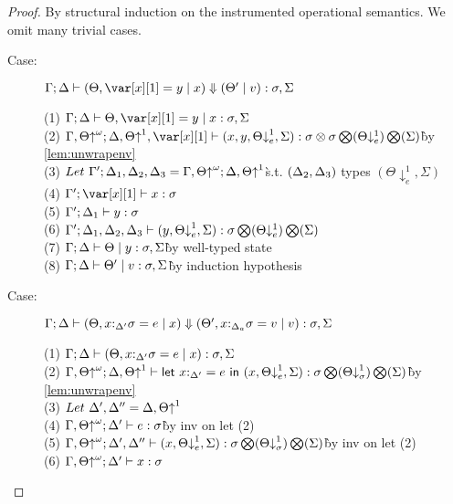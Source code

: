 \documentclass[acmsmall,review,anonymous,screen]{acmart}
\newcommand{\llet}[2]{\mathsf{let}~#1~\mathsf{in}~#2}
\begin{document}
\begin{proof}
By structural induction on the instrumented operational semantics. We
omit many trivial cases.
\begin{description}
    \item[Case:] $\Gamma; \Delta \vdash (\Theta, \xl = y \mid x) \Downarrow (\Theta' \mid v) : \s, \Sigma$
\begin{tabbing}
    (1) $\G; \D \vdash \Theta, \xl = y \mid x : \s, \Sigma$\\
    (2) $\G, \Theta{\uparrow}^\omega; \D, \Theta{\uparrow}^1, \xl \vdash (x, y, \Theta{\downarrow}^1_e, \Sigma) : \s \otimes \s \bigotimes(\Theta{\downarrow^1_e}) \bigotimes(\Sigma)$\`by \ref{lem:unwrapenv}\\
    (3) $Let~\Gamma';\Delta_1,\Delta_2,\Delta_3 = \Gamma, \Theta{\uparrow}^\omega; \Delta, \Theta{\uparrow}^1$\` s.t. $(\Delta_2,\Delta_3)$ types $(\Theta{\downarrow}^1_e,\Sigma)$\\
    (4) $\G'; \xl \vdash x : \s$\\
    (5) $\Gamma'; \Delta_1 \vdash y : \sigma$\\
    (6) $\Gamma'; \Delta_1, \Delta_2, \Delta_3 \vdash (y, \Theta{\downarrow}^1_e, \Sigma) : \sigma \bigotimes(\Theta{\downarrow^1_e}) \bigotimes(\Sigma)$\\
    (7) $\Gamma; \Delta \vdash \Theta \mid y : \sigma, \Sigma$\`by well-typed state\\
    (8) $\Gamma; \Delta \vdash \Theta' \mid v : \sigma, \Sigma$\` by induction hypothesis\\
\end{tabbing}
    \item[Case:] $\Gamma; \Delta \vdash (\Theta, x{:}_{\Delta'}\sigma = e \mid x) \Downarrow (\Theta', x{:}_{\Delta_a}\sigma = v \mid v) : \sigma, \Sigma$
\begin{tabbing}
    (1) $\Gamma; \Delta \vdash (\Theta, x{:}_{\Delta'}\sigma = e \mid x) : \sigma, \Sigma$\\
    (2) $\G, \Theta{\uparrow}^\omega; \D, \Theta{\uparrow}^1 \vdash \llet{x{:}_{\D'} = e}{(x, \Theta{\downarrow}^1_e, \Sigma)} : \s \bigotimes(\Theta{\downarrow}^1_\s) \bigotimes(\Sigma)$\`by \ref{lem:unwrapenv}\\
    (3) $Let~\Delta',\Delta'' = \Delta,\Theta{\uparrow}^1$\\
    (4) $\Gamma, \Theta{\uparrow}^\omega; \Delta' \vdash e : \sigma$\`by inv on let (2)\\
    (5) $\Gamma, \Theta{\uparrow}^\omega; \Delta', \Delta'' \vdash (x, \Theta{\downarrow}^1_e, \Sigma) : \sigma \bigotimes(\Theta{\downarrow}^1_\sigma) \bigotimes(\Sigma)$\`by inv on let (2)\\
    (6) $\Gamma, \Theta{\uparrow}^\omega; \Delta' \vdash x : \sigma$\\

\end{tabbing}
\end{description}
\end{proof}
\end{document}
